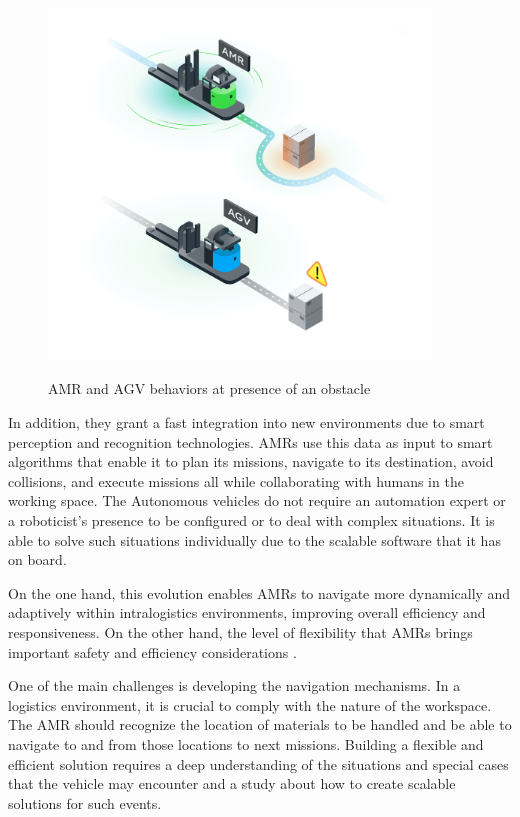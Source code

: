 \begin{figure}[H]
    \begin{center}
       \includegraphics[width=4in]{images/Chap1/AMR-VS-AGV.png}\\
       \caption{AMR and AGV behaviors at presence of an obstacle \cite{R9}}
       \label{AMR-VS-AGV}
       \end{center}
\end{figure}

In addition, they grant a fast integration into new environments due to smart perception 
and recognition technologies. AMRs use this data as input to smart algorithms that 
enable it to plan its missions, navigate to its destination, avoid collisions, and 
execute missions all while collaborating with humans in the working space. The 
Autonomous vehicles do not require an automation expert or a roboticist’s presence to 
be configured or to deal with complex situations. It is able to solve such situations 
individually due to the scalable software that it has on board.

On the one hand, this evolution enables AMRs to navigate more dynamically and adaptively 
within intralogistics environments, improving overall efficiency and responsiveness. 
On the other hand, the level of flexibility that AMRs brings important safety and 
efficiency considerations \cite{R7}.

One of the main challenges is developing the navigation mechanisms. In a logistics 
environment, it is crucial to comply with the nature of the workspace. The AMR should 
recognize the location of materials to be handled and be able to navigate to and from 
those locations to next missions. Building a flexible and efficient solution requires a 
deep understanding of the situations and special cases that the vehicle may encounter 
and a study about how to create scalable solutions for such events.  

